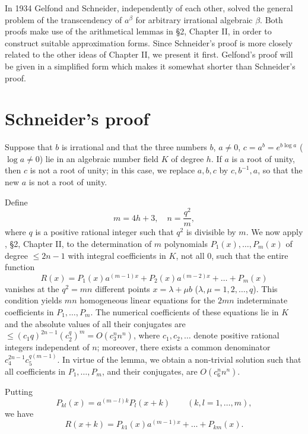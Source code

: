 In 1934 Gelfond and Schneider, independently of each other, solved the general problem of the transcendency of $a^\beta$ for arbitrary irrational algebraic $\beta$. Both proofs make use of the arithmetical lemmas in \S 2, Chapter II, in order to construct suitable approximation forms. Since Schneider's proof is more closely related to the other ideas of Chapter II, we present it first. Gelfond's proof will be given in a simplified form which makes it somewhat shorter than Schneider's proof.

\section{Schneider's proof}\label{sec:1}

Suppose that $b$ is irrational and that the three numbers $b$, $a \neq 0$, $c = a^b = e^{b \log a}$ ($\log a \neq 0$) lie in an algebraic number field $K$ of degree $h$. If $a$ is a root of unity, then $c$ is not a root of unity; in this case, we replace $a, b, c$ by $c, b^{-1}, a$, so that the new $a$ is not a root of unity.

Define
\[
m = 4h + 3, \quad n = \frac{q^2}{m},
\]
where $q$ is a positive rational integer such that $q^2$ is divisible by $m$. We now apply , \S 2, Chapter II, to the determination of $m$ polynomials $P_1(x), \dots, P_m(x)$ of degree $\le 2n - 1$ with integral coefficients in $K$, not all $0$, such that the entire function
\[
R(x) = P_1(x)a^{(m-1)x} + P_2(x)a^{(m-2)x} + \dots + P_m(x)
\]
vanishes at the $q^2 = mn$ different points $x = \lambda + \mu b$ ($\lambda, \mu = 1, 2, \dots, q$). This condition yields $mn$ homogeneous linear equations for the $2mn$ indeterminate coefficients in $P_1, \dots, P_m$. The numerical coefficients of these equations lie in $K$ and the absolute values of all their conjugates are $\le (c_1 q)^{2n-1} (c_2^q)^m = O(c_3^n n^n)$, where $c_1, c_2, \dots$ denote positive rational integers independent of $n$; moreover, there exists a common denominator $c_4^{2n-1} c_5^{q(m-1)}$. In virtue of the lemma, we obtain a non-trivial solution such that all coefficients in $P_1, \dots, P_m$, and their conjugates, are $O(c_6^n n^n)$.

Putting
\begin{equation}
P_{kl}(x) = a^{(m-l)k} P_l(x+k) \qquad (k, l = 1, \dots, m), \tag{110}\label{eq:110}
\end{equation}
we have
\begin{equation}
R(x+k) = P_{k1}(x)a^{(m-1)x} + \dots + P_{km}(x). \tag{111}\label{eq:111}
\end{equation}

